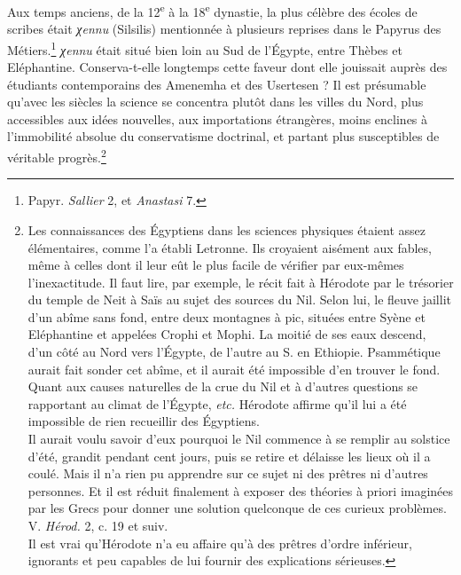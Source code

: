 \documentclass[letterpaper,twocolumn,openany,nodeprecatedcode]{dndbook}
\begin{document}
Aux temps anciens, de la 12\textsuperscript{e} à la 18\textsuperscript{e} dynastie, la plus célèbre des écoles de scribes était \emph{χennu} (Silsilis) mentionnée à plusieurs reprises dans le Papyrus des Métiers.\footnote{Papyr. \emph{Sallier} 2, et \emph{Anastasi} 7.} \emph{χennu} était situé bien loin au Sud de l'Égypte, entre Thèbes et Eléphantine. Conserva-t-elle longtemps cette faveur dont elle jouissait auprès des étudiants contemporains des Amenemha et des Usertesen ? Il est présumable qu'avec les siècles la science se concentra plutôt dans les villes du Nord, plus accessibles aux idées nouvelles, aux importations étrangères, moins enclines à l'immobilité absolue du conservatisme doctrinal, et partant plus susceptibles de véritable progrès.\footnote{Les connaissances des Égyptiens dans les sciences physiques étaient assez élémentaires, comme l'a établi Letronne. Ils croyaient aisément aux fables, même à celles dont il leur eût le plus facile de vérifier par eux-mêmes l'inexactitude. Il faut lire, par exemple, le récit fait à Hérodote par le trésorier du temple de Neit à Saïs au sujet des sources du Nil. Selon lui, le fleuve jaillit d'un abîme sans fond, entre deux montagnes à pic, situées entre Syène et Eléphantine et appelées Crophi et Mophi. La moitié de ses eaux descend, d'un côté au Nord vers l'Égypte, de l'autre au S. en Ethiopie. Psammétique aurait fait sonder cet abîme, et il aurait été impossible d'en trouver le fond. Quant aux causes naturelles de la crue du Nil et à d'autres questions se rapportant au climat de l'Égypte, \emph{etc.} Hérodote affirme qu'il lui a été impossible de rien recueillir des Égyptiens.\\\hspace*{5mm}Il aurait voulu savoir d'eux pourquoi le Nil commence à se remplir au solstice d'été, grandit pendant cent jours, puis se retire et délaisse les lieux où il a coulé. Mais il n'a rien pu apprendre sur ce sujet ni des prêtres ni d'autres personnes. Et il est réduit finalement à exposer des théories à priori imaginées par les Grecs pour donner une solution quelconque de ces curieux problèmes. V. \emph{Hérod.} 2, c. 19 et suiv.\\\hspace*{5mm}Il est vrai qu'Hérodote n'a eu affaire qu'à des prêtres d'ordre inférieur, ignorants et peu capables de lui fournir des explications sérieuses.}
\end{document}
